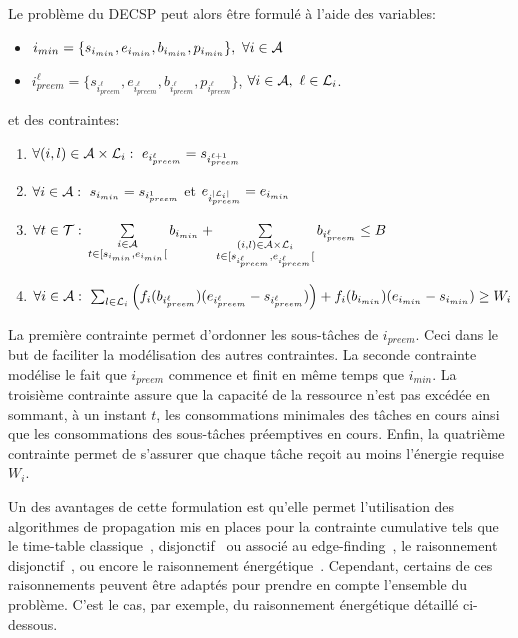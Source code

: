 Le problème du DECSP peut alors être formulé à l'aide des variables:
{\scriptsize
\begin{itemize}
\item $i_{min}=\{s_{i_{min}}, e_{i_{min}}, b_{i_{min}},p_{i_{min}}\},\ 
  \forall i \in {\cal A}$ 
\item $i_{preem}^\ell=\{s_{i_{preem}^\ell},e_{i_{preem}^\ell},
  b_{i_{preem}^\ell},p_{i_{preem}^\ell}\}$, $\forall i \in {\cal A},\
  \ell \in {\cal L}_i$.
\end{itemize}
et des contraintes:
\begin{enumerate}  
\item $\forall (i,l) \in {\cal A} \times {\cal L}_i:\
  e_{i_{preem}^\ell} = s_{i_{preem}^{\ell+1}}$ 
\vspace{0.2cm}
\item $\forall i \in {\cal A}:\  s_{i_{min}} = s_{i_{preem}^1}$ et $ e_{i_{preem}^{|{\cal L}_i|}} = e_{i_{min}}$   
\vspace{0.2cm}
\item $\forall t \in  {\cal T}:\\ \sum\limits_{\substack{i \in {\cal A} \\ t \in [s_{i_{min}},e_{i_{min}}[}} b_{i_{min}}
  + \sum\limits_{\substack{(i,l) \in {\cal A}\times {\cal L}_i\\ t \in
      [s_{i_{preem}^\ell},e_{i_{preem}^\ell}[}}
  b_{i_{preem}^\ell} \le B$ 
\vspace{0.2cm}
\item $\forall i \in {\cal A}:\ \sum_{l \in {\cal L}_i} \left(f_i(b_{i_{preem}^\ell})
    (e_{i_{preem}^\ell}-s_{i_{preem}^\ell})\right) +
  f_i(b_{i_{min}}) (e_{i_{min}}-s_{i_{min}}) \ge W_i $
\end{enumerate}}
La première contrainte permet d'ordonner les sous-tâches de
$i_{preem}$. Ceci dans le but de faciliter la modélisation des autres
contraintes. La seconde contrainte modélise le fait que $i_{preem}$
commence et finit en même temps que $i_{min}$. La troisième contrainte
assure que la capacité de la ressource n'est pas excédée en sommant, à
un instant $t$, les consommations minimales des tâches en cours ainsi
que les consommations des sous-tâches préemptives en cours. Enfin, la
quatrième contrainte permet de s'assurer que chaque tâche reçoit au
moins l'énergie requise $W_i$. 

Un des avantages de cette formulation est qu'elle permet l'utilisation
des algorithmes de propagation mis en places pour la contrainte
cumulative tels que le time-table classique~\cite{Baptiste2001},
disjonctif~\cite{Gay2015} ou associé au edge-finding~\cite{Vilim2011},
le raisonnement disjonctif~\cite{Baptiste2001}, ou encore le
raisonnement énergétique~\cite{Lopez1990}. Cependant, certains de ces
raisonnements peuvent être adaptés pour 
prendre en compte l'ensemble du problème. C'est le cas, par exemple,
du raisonnement énergétique détaillé ci-dessous.

